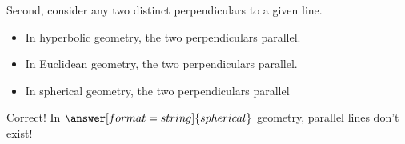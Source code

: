 \documentclass{ximera}
\begin{document}
\begin{problem}
\begin{problem}
\begin{problem}
Second, consider any two distinct perpendiculars to a given line.  
\begin{itemize}
\item In hyperbolic geometry, the two perpendiculars  parallel.    
\item In Euclidean geometry, the two perpendiculars  parallel.  
\item In spherical geometry, the two perpendiculars  parallel 
\end{itemize}
\begin{problem}
Correct!  In $\answer[format=string]{spherical}$ geometry, parallel lines don't exist!   


\end{problem}
\end{problem}
\end{problem}
\end{problem}
\end{document}
